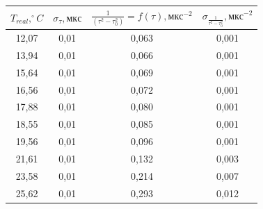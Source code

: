 \documentclass[a4paper, fontsize = 14pt]{article}
\begin{document}
\begin{table}[hbt]
    \centering
\begin{tabular}{|c|c|c|c|}
\hline
\textbf{$T_{real},   ^\circ C$} & \textbf{$\sigma_{\tau}, мкс$} & \textbf{$\frac{1}{(\tau^2-\tau_0^2)}=f(\tau),   мкс^{-2}$} & \textbf{$\sigma_{\frac{1}{\tau^2-\tau_0^2}},   мкс^{-2}$} \\ \hline
12,07                           & 0,01                          & 0,063                                                      & 0,001                                                      \\ \hline
13,94                           & 0,01                          & 0,066                                                      & 0,001                                                      \\ \hline
15,64                           & 0,01                          & 0,069                                                      & 0,001                                                      \\ \hline
16,56                           & 0,01                          & 0,072                                                      & 0,001                                                      \\ \hline
17,88                           & 0,01                          & 0,080                                                      & 0,001                                                      \\ \hline
18,55                           & 0,01                          & 0,085                                                      & 0,001                                                      \\ \hline
19,56                           & 0,01                          & 0,096                                                      & 0,001                                                      \\ \hline
21,61                           & 0,01                          & 0,132                                                      & 0,003                                                      \\ \hline
23,58                           & 0,01                          & 0,214                                                      & 0,007                                                      \\ \hline
25,62                           & 0,01                          & 0,293                                                      & 0,012                                                      \\ \hline

\end{tabular}
\end{table}
\end{document}
